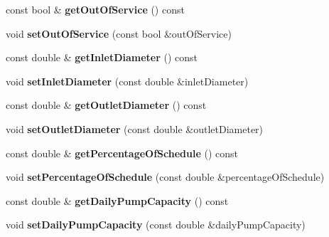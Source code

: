 \begin{DoxyCompactItemize}
\item 
\mbox{\label{class_pump_data_a733ce5488cf980f07bfaed5b82909802}} 
const bool \& {\bfseries get\+Out\+Of\+Service} () const
\item 
\mbox{\label{class_pump_data_ab6c3468206a374bd28e11fbcc12fbfe5}} 
void {\bfseries set\+Out\+Of\+Service} (const bool \&out\+Of\+Service)
\item 
\mbox{\label{class_pump_data_a11df4b06b5c71fad796a0fa97f8361cd}} 
const double \& {\bfseries get\+Inlet\+Diameter} () const
\item 
\mbox{\label{class_pump_data_a8aae1ff5b0a23ef9f9c3edcd40657a9f}} 
void {\bfseries set\+Inlet\+Diameter} (const double \&inlet\+Diameter)
\item 
\mbox{\label{class_pump_data_ad231961ed2640e817d8658ad7c84963a}} 
const double \& {\bfseries get\+Outlet\+Diameter} () const
\item 
\mbox{\label{class_pump_data_a9add2f19a04456530c1b5d1564b20684}} 
void {\bfseries set\+Outlet\+Diameter} (const double \&outlet\+Diameter)
\item 
\mbox{\label{class_pump_data_a566f8be6bdbf9b1beef69814aff14d73}} 
const double \& {\bfseries get\+Percentage\+Of\+Schedule} () const
\item 
\mbox{\label{class_pump_data_ac3e2c4f36a0373e3f0b9385ba39a8538}} 
void {\bfseries set\+Percentage\+Of\+Schedule} (const double \&percentage\+Of\+Schedule)
\item 
\mbox{\label{class_pump_data_a8cf8cb47fb42a1d02397dad356735e25}} 
const double \& {\bfseries get\+Daily\+Pump\+Capacity} () const
\item 
\mbox{\label{class_pump_data_a89efc6467e866a8746aaa0ece660a760}} 
void {\bfseries set\+Daily\+Pump\+Capacity} (const double \&daily\+Pump\+Capacity)
\item 
\mbox{\label{class_pump_data_ad13d635be416d206121ef10ceb11ae4b}} 

\end{DoxyCompactItemize}
